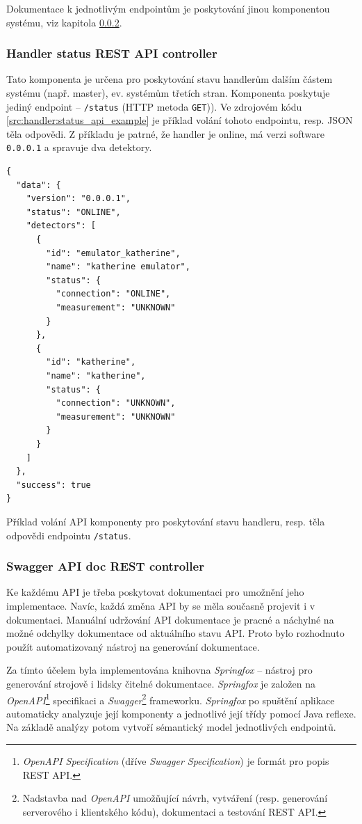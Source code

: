 Dokumentace k jednotlivým endpointům je poskytování jinou komponentou systému, viz kapitola \ref{chap:handler:spring:swagger}.

\subsubsection{Handler status REST API controller}\label{chap:handler:spring:status_api}
Tato komponenta je určena pro poskytování stavu handlerům dalším částem systému (např. master), ev. systémům třetích stran. Komponenta poskytuje jediný endpoint -- \texttt{/status} (HTTP metoda \texttt{GET})). Ve zdrojovém kódu \ref{src:handler:status_api_example} je příklad volání tohoto endpointu, resp. JSON těla odpovědi. Z příkladu je patrné, že handler je online, má verzi software \texttt{0.0.0.1} a spravuje dva detektory.

\begin{code}[h!]
  \begin{verbatim}
{
  "data": {
    "version": "0.0.0.1",
    "status": "ONLINE",
    "detectors": [
      {
        "id": "emulator_katherine",
        "name": "katherine emulator",
        "status": {
          "connection": "ONLINE",
          "measurement": "UNKNOWN"
        }
      },
      {
        "id": "katherine",
        "name": "katherine",
        "status": {
          "connection": "UNKNOWN",
          "measurement": "UNKNOWN"
        }
      }
    ]
  },
  "success": true
}
\end{verbatim}
\caption{Příklad volání API komponenty pro poskytování stavu handleru, resp. těla odpovědi endpointu \texttt{/status}.}
\label{src:handler:status_api_example}
\end{code}


\subsubsection{Swagger API doc REST controller}\label{chap:handler:spring:swagger}
Ke každému API je třeba poskytovat dokumentaci pro umožnění jeho implementace. Navíc, každá změna API by se měla současně projevit i v dokumentaci. Manuální udržování API dokumentace je pracné a náchylné na možné odchylky dokumentace od aktuálního stavu API. Proto bylo rozhodnuto použít automatizovaný nástroj na generování dokumentace.

Za tímto účelem byla implementována knihovna \textit{Springfox} \cite{springfox} -- nástroj pro generování strojově i lidsky čitelné dokumentace. \textit{Springfox} je založen na \textit{OpenAPI}\footnote{\textit{OpenAPI Specification} (dříve \textit{Swagger Specification}) je formát pro popis REST API.} specifikaci a \textit{Swa\-gger}\footnote{Nadstavba nad \textit{OpenAPI} umožňující návrh, vytváření (resp. generování serverového i klientského kódu), dokumentaci a testování REST API.} frameworku. \textit{Springfox} po spuštění aplikace automaticky analyzuje její komponenty a jednotlivé její třídy pomocí Java reflexe. Na základě analýzy potom vytvoří sémantický model jednotlivých endpointů.

